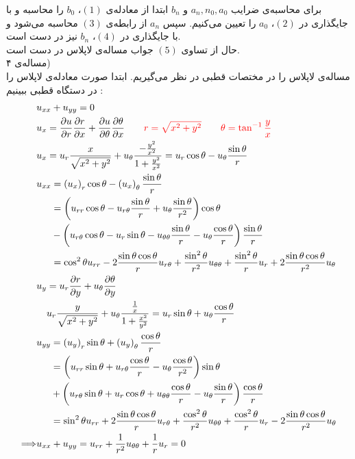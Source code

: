 برای محاسبه‌ی ضرایب
$a_n,n_0,a_0$
و
$b_n$
ابتدا از معادله‌ی
$(1)$،
$b_0$
را محاسبه و با جایگذاری در
$(2)$،
$a_0$
را تعیین می‌کنیم. سپس
$a_n$
از رابطه‌ی
$(3)$
محاسبه می‌شود و با جایگذاری در
$(4)$،
$b_n$
نیز در دست است.\\
حال از تساوی
$(5)$
جواب مساله‌ی لاپلاس در دست است.\\
مساله‌ی ۴)\\
مساله‌ی لاپلاس را در مختصات قطبی در نظر می‌گیریم. ابتدا صورت معادله‌ی لاپلاس را در دستگاه قطبی ببینیم :
\[\begin{aligned}
	& u_{xx}+u_{yy}=0
	\\ &
	u_x=\frac{\partial u}{\partial r}\frac{\partial r}{\partial x}+\frac{\partial u}{\partial\theta}\frac{\partial\theta}{\partial x} \qquad
	\textcolor{red}{r=\sqrt{x^2+y^2}} \qquad
	\textcolor{red}{\theta=\tan^{-1}\frac{y}{x}}
	\\  &
	u_x=u_r\frac{x}{\sqrt{x^2+y^2}}+u_\theta\frac{-\frac{y^2}{x^2}}{1+\frac{y^2}{x^2}}=u_r\cos\theta-u_\theta\frac{\sin\theta}r
	\\ &
	\begin{aligned}
		u_{xx} & =
		\left(u_x\right)_r\cos\theta-\left(u_x\right)_\theta\frac{\sin\theta}r
		\\ &=\left(
		{u_{rr}\cos\theta}-{u_{r\theta}\frac{\sin\theta}r}+u_\theta\frac{\sin\theta}{r^2}
		\right)\cos\theta
		\\ & -
		\left(
		u_{r\theta}\cos\theta-u_r\sin\theta-u_{\theta\theta}\frac{\sin\theta}r-u_\theta\frac{\cos\theta}r
		\right)\frac{\sin\theta}r
		\\ &
		=\cos^2\theta u_{rr}-2\frac{\sin\theta\cos\theta}ru_{r\theta}+\frac{\sin^2\theta}{r^2}u_{\theta\theta}+\frac{\sin^2\theta}ru_r+2\frac{\sin\theta\cos\theta}{r^2}u_\theta
	\end{aligned}
	\\ &
	\begin{aligned}
		u_y& =u_r\frac{\partial r}{\partial 	y}+u_\theta\frac{\partial\theta}{\partial y}
		\\ &
		u_r\frac{y}{\sqrt{x^2+y^2}}+u_\theta\frac{\frac1x}{1+\frac{x^2}{y^2}}=u_r\sin\theta+u_\theta\frac{\cos\theta}r
	\end{aligned}
	\\ &
	\begin{aligned}
		u_{yy} &=
		\left(u_y\right)_r\sin\theta+\left(u_y\right)_\theta\frac{\cos\theta}r
		\\ &=
		\left(u_{rr}\sin\theta+u_{r\theta}\frac{\cos\theta}r-u_\theta\frac{\cos\theta}{r^2}\right)\sin\theta
		\\ &+
		\left(u_{r\theta}\sin\theta+u_r\cos\theta+u_{\theta\theta}\frac{\cos\theta}r-u_\theta\frac{\sin\theta}r\right)\frac{\cos\theta}r
		\\ &
		=\sin^2\theta u_{rr}+2\frac{\sin\theta\cos\theta}ru_{r\theta}+\frac{\cos^2\theta}{r^2}u_{\theta\theta}+\frac{\cos^2\theta}ru_r-2\frac{\sin\theta\cos\theta}{r^2}u_\theta
	\end{aligned}
	\\ \Longrightarrow &
	u_{xx}+u_{yy}=u_{rr}+\frac1{r^2}u_{\theta\theta}+\frac1ru_r=0
\end{aligned}\]
